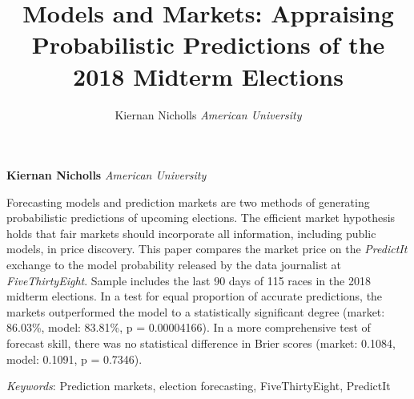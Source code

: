 \documentclass[11pt,]{article}
\title{Models and Markets: Appraising Probabilistic Predictions of the 2018 Midterm Elections  }
\author{\Large Kiernan Nicholls\vspace{0.05in} \newline\normalsize\emph{American University}  }
\date{}
\newcommand*{\authorfont}{\fontfamily{phv}\selectfont}
\renewenvironment{abstract}
 {{%
    \setlength{\leftmargin}{0mm}
    \setlength{\rightmargin}{\leftmargin}%
  }%
  \relax}
 {\endlist}
\begin{document}
	
%

{%
\setlength{\parindent}{0pt}
\thispagestyle{plain}
{\fontsize{18}{20}\selectfont\raggedright 
\maketitle  %

}

{
   \vskip 13.5pt\relax \normalsize\fontsize{11}{12} 
\textbf{\authorfont Kiernan Nicholls} \hskip 15pt \emph{\small American University}   

}

}








\begin{abstract}

    \hbox{\vrule height .2pt width 39.14pc}

    \vskip 8.5pt %

\noindent Forecasting models and prediction markets are two methods of generating
probabilistic predictions of upcoming elections. The efficient market
hypothesis holds that fair markets should incorporate all information,
including public models, in price discovery. This paper compares the
market price on the \emph{PredictIt} exchange to the model probability
released by the data journalist at \emph{FiveThirtyEight}. Sample
includes the last 90 days of 115 races in the 2018 midterm elections. In
a test for equal proportion of accurate predictions, the markets
outperformed the model to a statistically significant degree (market:
86.03\%, model: 83.81\%, p = 0.00004166). In a more comprehensive test
of forecast skill, there was no statistical difference in Brier scores
(market: 0.1084, model: 0.1091, p = 0.7346).


\vskip 8.5pt \noindent \emph{Keywords}: Prediction markets, election forecasting, FiveThirtyEight, PredictIt \par

    \hbox{\vrule height .2pt width 39.14pc}



\end{abstract}
\end{document}

